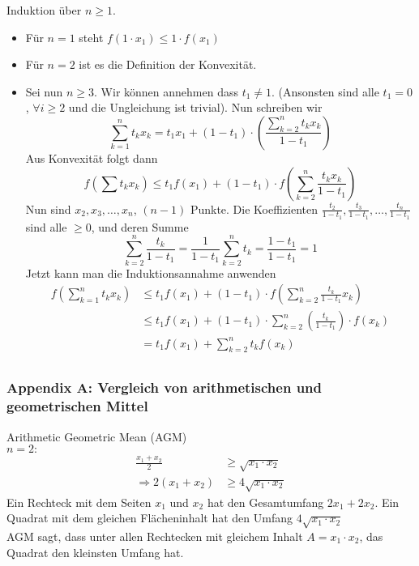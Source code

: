 \begin{beweis}{5.44}
Induktion über $n\geq 1$.\\
\begin{itemize}
\item Für $n=1$ steht $f(1\cdot x_1)\leq 1\cdot f(x_1)$ \checkmark
\item Für $n=2$ ist es die Definition der Konvexität.
\item Sei nun $n\geq 3$. Wir können annehmen dass $t_1\not=1$. (Ansonsten sind alle $t_1=0$, $\forall i\geq 2$ und die Ungleichung ist trivial). Nun schreiben wir
\[\sum\limits_{k = 1}^n {{t_k}{x_k}}  = {t_1}{x_1} + \left( {1 - {t_1}} \right) \cdot \left( {\frac{{\sum\limits_{k = 2}^n {{t_k}{x_k}} }}{{1 - {t_1}}}} \right)\]
Aus Konvexität folgt dann
\[f\left( \sum t_kx_k \right)\leq t_1f(x_1)+\left( 1-t_1\right)\cdot f\left( \sum\limits_{k=2}^n \frac{t_k x_k}{1-t_1}\right)\]
Nun sind $x_2,x_3,\dots, x_n$, $(n-1)$ Punkte. Die Koeffizienten $\frac{t_2}{1-t_1},\frac{t_3}{1-t_1},\dots,\frac{t_n}{1-t_1}$ sind alle $\geq 0$, und deren Summe
\[\sum\limits_{k = 2}^n {\frac{{{t_k}}}{{1 - {t_1}}}}  = \frac{1}{{1 - {t_1}}}\sum\limits_{k = 2}^n {{t_k}}  = \frac{{1 - {t_1}}}{{1 - {t_1}}} = 1\]
Jetzt kann man die Induktionsannahme anwenden
\begin{align*}
f\left( \sum\limits_{k = 1}^n {{t_k}{x_k}} \right)&\leq t_1f(x_1)+\left( 1-t_1\right)\cdot f\left( \sum\limits_{k = 2}^n \frac{t_k}{1-t_1}x_k\right)\\
&\leq t_1f(x_1)+\left( 1-t_1\right)\cdot\sum\limits_{k = 2}^n \left(\frac{t_k}{1-t_1}\right)\cdot f(x_k)\\
&= t_1f(x_1)+\sum\limits_{k = 2}^n t_k f(x_k)\\
\end{align*}
\end{itemize}
\end{beweis}

\newpage
\subsubsection*{Appendix A: Vergleich von arithmetischen und geometrischen Mittel}
Arithmetic Geometric Mean (AGM) \\
$n=2:$
\begin{align*}
\frac{x_1+x_2}{2}&\geq\sqrt{x_1\cdot x_2}\\
\Rightarrow 2(x_1+x_2)&\geq 4\sqrt{x_1\cdot x_2}
\end{align*}
Ein Rechteck mit dem Seiten $x_1$ und $x_2$ hat den Gesamtumfang $2x_1+2x_2$. Ein Quadrat mit dem gleichen Flächeninhalt hat den Umfang $4\sqrt{x_1\cdot x_2}$\\

AGM sagt, dass unter allen Rechtecken mit gleichem Inhalt $A=x_1\cdot x_2$, das Quadrat den kleinsten Umfang hat.





